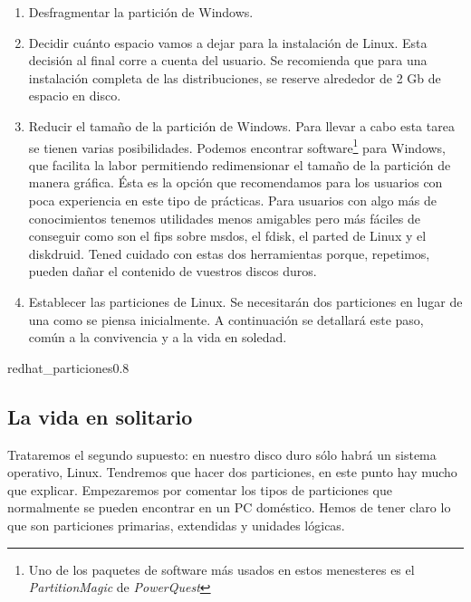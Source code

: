 \begin{enumerate}
\item Desfragmentar la partición de Windows.

\item  Decidir cuánto  espacio vamos  a dejar  para la  instalación de
Linux.  Esta  decisión  al  final  corre  a  cuenta  del  usuario.  Se
recomienda que para una instalación completa de las distribuciones, se
reserve alrededor de 2 Gb de espacio en disco.

\item Reducir  el tamaño  de la  partición de  Windows. Para  llevar a
cabo  esta tarea  se  tienen varias  posibilidades. Podemos  encontrar
software\footnote{Uno de los paquetes de  software más usados en estos
menesteres  es  el  \emph{PartitionMagic} de  \emph{PowerQuest}}  para
Windows, que facilita la labor  permitiendo redimensionar el tamaño de
la partición  de manera  gráfica. Ésta es  la opción  que recomendamos
para los usuarios con poca experiencia en este tipo de prácticas. Para
usuarios  con  algo  más  de conocimientos  tenemos  utilidades  menos
amigables pero más fáciles de conseguir  como son el fips sobre msdos,
el fdisk, el parted de Linux  y el diskdruid. Tened cuidado con estas
dos  herramientas  porque, repetimos,  pueden  dañar  el contenido  de
vuestros discos duros.

\item Establecer   las  particiones   de   Linux. Se necesitarán   dos
particiones  en   lugar  de  una   como  se  piensa   inicialmente.  A
continuación se detallará este paso, común a la convivencia y a la vida en soledad.

\end{enumerate}

\begin{figura}{redhat_particiones}{0.8}
\caption{Preparación de las particiones}
\end{figura}


\subsection{La vida en solitario}

Trataremos el  segundo supuesto: en  nuestro disco duro sólo  habrá un
sistema operativo, Linux. Tendremos que hacer dos particiones, en este
punto hay  mucho que explicar.  Empezaremos por comentar los  tipos de
particiones que  normalmente se pueden  encontrar en un  PC doméstico.
Hemos de  tener claro lo  que son particiones primarias,  extendidas y
unidades lógicas.


